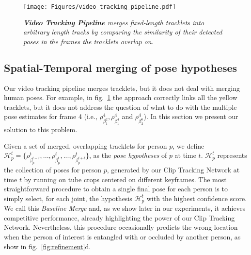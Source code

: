 \documentclass[10pt,twocolumn,letterpaper]{article}
\begin{document}
\begin{figure}
   \texttt{[image: Figures/video\_tracking\_pipeline.pdf]}
   \vspace{-7mm}
   \caption{\small \it {\bf Video Tracking Pipeline} merges fixed-length tracklets into arbitrary length tracks by comparing the similarity of their detected poses in the frames the tracklets overlap on.\vspace{-4mm}}
   \label{fig:long_video_tracking_fig} 
\end{figure}

\subsection{Spatial-Temporal merging of pose hypotheses}\label{sec:refinement}

Our video tracking pipeline merges tracklets, but it does not deal with merging human poses. For example, in fig.~\ref{fig:long_video_tracking_fig} the approach correctly links all the yellow tracklets, but it does not address the question of what to do with the multiple pose estimates for frame 4 (i.e., $\rho_{\beta_1^2}^4, \rho_{\beta_1^4}^4$ and $\rho_{\beta_2^6}^4$). In this section we present our solution to this problem.

Given a set of merged, overlapping tracklets for person $p$, we define {\small $\mathcal{H}_p^t=\{\rho_{\beta_p^{t-\delta}}^{t}, ..., \rho_{\beta_p^{t}}^{t}, ..., \rho_{\beta_p^{t+\delta}}^{t}\}$}, as the {\it pose hypotheses} of $p$ at time $t$. $\mathcal{H}_p^t$ represents the collection of poses for person $p$, generated by our Clip Tracking Network at time $t$ by running on tube crops centered on different keyframes. The most straightforward procedure to obtain a single final pose for each person is to simply select, for each joint, the hypothesis $\mathcal{H}_p^t$ with the highest confidence score. We call this {\it Baseline Merge} and, as we show later in our experiments, it achieves competitive performance, already highlighting the power of our Clip Tracking Network. Nevertheless, this procedure occasionally predicts the wrong location when the person of interest is entangled with or occluded by another person, as show in fig.~\ref{fig:refinement}{\color{red}d}. 
\end{document}
